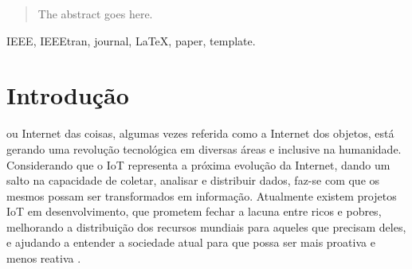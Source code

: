 \documentclass[journal]{IEEEtran}
\begin{document}







\maketitle

\begin{abstract}
The abstract goes here.
\end{abstract}

\begin{IEEEkeywords}
IEEE, IEEEtran, journal, \LaTeX, paper, template.
\end{IEEEkeywords}






%
\IEEEpeerreviewmaketitle



\section{Introdução}
% 
% 
% 
% 
 ou Internet das coisas, algumas vezes referida como a Internet dos objetos, está gerando uma revolução tecnológica em diversas áreas e inclusive na humanidade. Considerando que o IoT representa a próxima evolução da Internet, dando um salto na capacidade de coletar, analisar e distribuir dados, faz-se com que os mesmos possam ser transformados em informação. Atualmente existem projetos IoT em desenvolvimento, que prometem fechar a lacuna entre ricos e pobres, melhorando a distribuição dos recursos mundiais para aqueles que precisam deles, e ajudando a entender a sociedade atual para que possa ser mais proativa e menos reativa \cite[p.~2]{Evans}.
\end{document}
